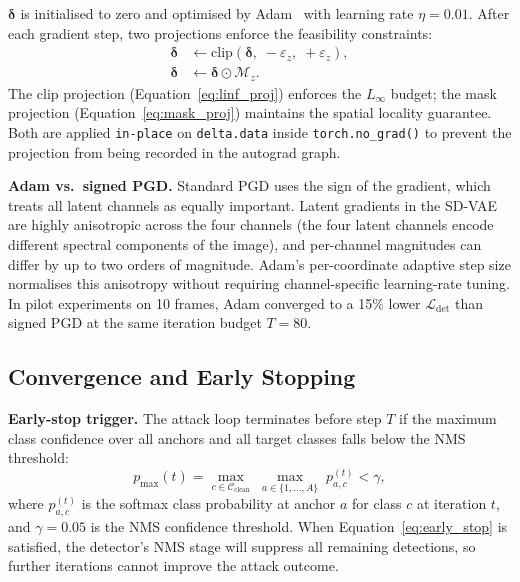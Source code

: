 \documentclass[12pt,a4paper]{report}
\begin{document}
$\bm{\delta}$ is initialised to zero and optimised by Adam~\cite{kingma2015adam}
with learning rate $\eta = 0.01$.
After each gradient step, two projections enforce the feasibility constraints:
\begin{align}
  \bm{\delta} &\leftarrow \mathrm{clip}(\bm{\delta},\; -\varepsilon_z,\; +\varepsilon_z),
  \label{eq:linf_proj}\\
  \bm{\delta} &\leftarrow \bm{\delta} \odot \mathcal{M}_z.
  \label{eq:mask_proj}
\end{align}
The clip projection (Equation~\ref{eq:linf_proj}) enforces the
$L_\infty$ budget; the mask projection (Equation~\ref{eq:mask_proj})
maintains the spatial locality guarantee.  Both are applied
\texttt{in-place} on \texttt{delta.data} inside
\texttt{torch.no\_grad()} to prevent the projection from being
recorded in the autograd graph.

\textbf{Adam vs.\ signed PGD.}
Standard PGD uses the sign of the gradient, which treats all latent
channels as equally important.  Latent gradients in the SD-VAE are
highly anisotropic across the four channels (the four latent channels
encode different spectral components of the image), and per-channel
magnitudes can differ by up to two orders of magnitude.  Adam's
per-coordinate adaptive step size normalises this anisotropy without
requiring channel-specific learning-rate tuning.  In pilot experiments
on 10 frames, Adam converged to a 15\% lower $\mathcal{L}_\text{det}$
than signed PGD at the same iteration budget $T = 80$.

\subsection{Convergence and Early Stopping}
\label{sec:convergence}

\textbf{Early-stop trigger.}
The attack loop terminates before step $T$ if the maximum class
confidence over all anchors and all target classes falls below the
NMS threshold:
\begin{equation}
  p_{\max}(t) = \max_{c \in \mathcal{C}_\text{clean}}\;
                \max_{a \in \{1,\ldots,A\}}\;
                p_{a,c}^{(t)} < \gamma,
  \label{eq:early_stop}
\end{equation}
where $p_{a,c}^{(t)}$ is the softmax class probability at anchor
$a$ for class $c$ at iteration $t$, and $\gamma = 0.05$ is the NMS
confidence threshold.  When Equation~\ref{eq:early_stop} is satisfied,
the detector's NMS stage will suppress all remaining detections,
so further iterations cannot improve the attack outcome.
\end{document}
